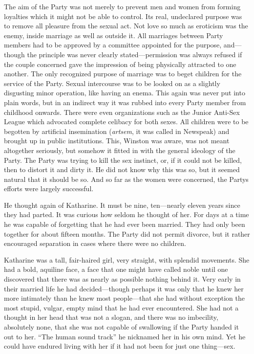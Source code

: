 The aim of the Party was not merely to prevent men and women from
forming loyalties which it might not be able to control. Its real,
undeclared purpose was to remove all pleasure from the sexual act. Not
love so much as eroticism was the enemy, inside marriage as well as
outside it. All marriages between Party members had to be approved by a
committee appointed for the purpose, and---though the principle was
never clearly stated---permission was always refused if the couple
concerned gave the impression of being physically attracted to one
another. The only recognized purpose of marriage was to beget children
for the service of the Party. Sexual intercourse was to be looked on as
a slightly disgusting minor operation, like having an enema. This again
was never put into plain words, but in an indirect way it was rubbed
into every Party member from childhood onwards. There were even
organizations such as the Junior Anti-Sex League which advocated
complete celibacy for both sexes. All children were to be begotten by
artificial insemination (\emph{artsem}, it was called in Newspeak) and
brought up in public institutions. This, Winston was aware, was not
meant altogether seriously, but somehow it fitted in with the general
ideology of the Party. The Party was trying to kill the sex instinct,
or, if it could not be killed, then to distort it and dirty it. He did
not know why this was so, but it seemed natural that it should be so.
And so far as the women were concerned, the Party\textquotesingle s
efforts were largely successful.

He thought again of Katharine. It must be nine, ten---nearly eleven
years since they had parted. It was curious how seldom he thought of
her. For days at a time he was capable of forgetting that he had ever
been married. They had only been together for about fifteen months. The
Party did not permit divorce, but it rather encouraged separation in
cases where there were no children.

Katharine was a tall, fair-haired girl, very straight, with splendid
movements. She had a bold, aquiline face, a face that one might have
called noble until one discovered that there was as nearly as possible
nothing behind it. Very early in their married life he had
decided---though perhaps it was only that he knew her more intimately
than he knew most people---that she had without exception the most
stupid, vulgar, empty mind that he had ever encountered. She had not a
thought in her head that was not a slogan, and there was no imbecility,
absolutely none, that she was not capable of swallowing if the Party
handed it out to her. ``The human sound track'' he nicknamed her in his
own mind. Yet he could have endured living with her if it had not been
for just one thing---sex.

